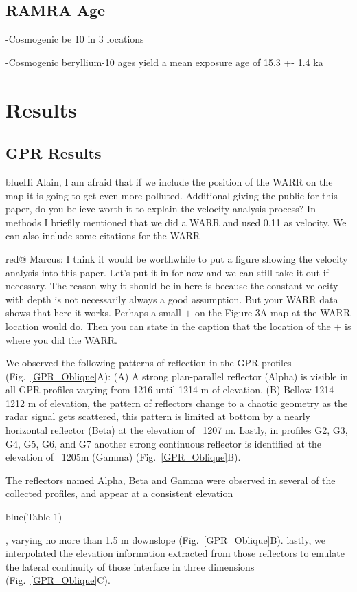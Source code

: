 \documentclass[utf8]{frontiersSCNS}
\newcommand{\COMON}{\begin{color}{blue}}
\newcommand{\COMOFF}{\end{color}}
\newcommand{\alon}{\begin{color}{red}}
\newcommand{\aloff}{\end{color}}
\begin{document}
\subsection{RAMRA Age}

-Cosmogenic be 10 in 3 locations

-Cosmogenic beryllium-10 ages yield a mean exposure age of 15.3 +- 1.4 ka



 
\section{Results}


\subsection{GPR Results}



\COMON Hi Alain, I am afraid that if we include the position of the WARR on the map it is going to get even more polluted. Additional giving the public for this paper, do you believe worth it to explain the velocity analysis process? In methods I briefily mentioned that we did a WARR and used 0.11 as velocity. We can also include some citations for the WARR \COMOFF
\alon @ Marcus: I think it would be worthwhile to put a figure showing the velocity analysis into this paper. Let's put it in for now and we can still take it out if necessary. The reason why it should be in here is because the constant velocity with depth is not necessarily always a good assumption. But your WARR data shows that here it works. Perhaps a small $+$ on the Figure 3A map at the WARR location would do. Then you can state in the caption that the location of the $+$ is where you did the WARR.  \aloff


We observed the following patterns of reflection in the GPR profiles (Fig.~\ref{GPR_Oblique}A): (A) A strong plan-parallel reflector (Alpha) is visible in all GPR profiles varying from 1216 until 1214 m of elevation. (B) Bellow 1214-1212 m of elevation, the pattern of reflectors change to a chaotic geometry as the radar signal gets scattered, this pattern is limited at bottom  by a nearly horizontal reflector (Beta)  at the elevation of ~1207 m. Lastly, in profiles G2,  G3, G4, G5, G6, and G7 another strong continuous reflector is identified at the elevation of ~1205m (Gamma) (Fig.~\ref{GPR_Oblique}B). 

The reflectors named Alpha, Beta and Gamma were observed in several of the collected profiles, and appear at a consistent elevation \COMON (Table 1) \COMOFF, varying no more than 1.5 m downslope (Fig.~\ref{GPR_Oblique}B). lastly, we interpolated the elevation information extracted from those reflectors to emulate the lateral continuity of those interface in three dimensions (Fig.~\ref{GPR_Oblique}C).  
\end{document}

